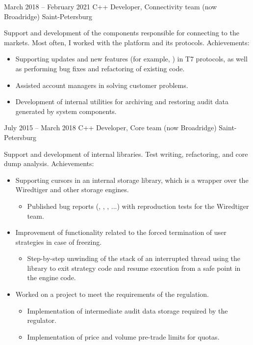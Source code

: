 \documentclass[11pt,a4paper,sans]{moderncv}
\begin{document}
\cventry
{March 2018 -- February 2021}
{C++ Developer, Connectivity team}
{(now Broadridge)}
{Saint-Petersburg}
{}
{Support and development of the components responsible for connecting to the markets. Most often, I worked with the  platform and its protocols.\newline{}
Achievements:
\begin{itemize}
\item Supporting updates and new features (for example, ) in T7 protocols, as well as performing bug fixes and refactoring of existing code.
\item Assisted account managers in solving customer problems.
\item Development of internal utilities for archiving and restoring audit data generated by system components.
\end{itemize}}

\cventry
{July 2015 -- March 2018}
{C++ Developer, Core team}
{(now Broadridge)}
{Saint-Petersburg}
{}
{Support and development of internal libraries. Test writing, refactoring, and core dump analysis.\newline{}
Achievements:
\begin{itemize}
\item Supporting  cursors in an internal storage library, which is a wrapper over the Wiredtiger and other storage engines.
  \begin{itemize}
  \item Published bug reports (, , , ...) with reproduction tests for the Wiredtiger team.
  \end{itemize}
\item Improvement of functionality related to the forced termination of user strategies in case of freezing.
  \begin{itemize}
  \item Step-by-step unwinding of the stack of an interrupted thread using the  library to exit strategy code and resume execution from a safe point in the engine code.
  \end{itemize}
\item Worked on a project to meet the requirements of the  regulation.
  \begin{itemize}
  \item Implementation of intermediate audit data storage required by the regulator.
  \item Implementation of price and volume pre-trade limits for quotas.
  \end{itemize}
\end{itemize}}
\end{document}

